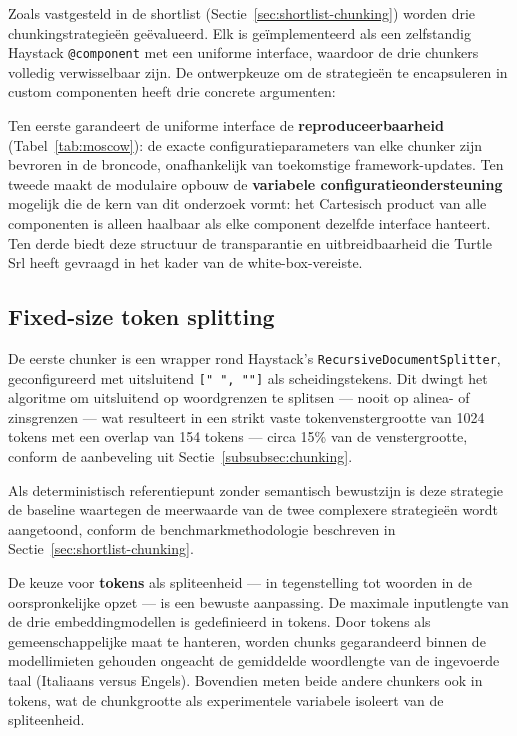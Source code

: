 Zoals vastgesteld in de shortlist (Sectie~\ref{sec:shortlist-chunking}) worden drie chunkingstrategieën geëvalueerd. Elk is geïmplementeerd als een zelfstandig Haystack \texttt{@component} met een uniforme interface, waardoor de drie chunkers volledig verwisselbaar zijn. De ontwerpkeuze om de strategieën te encapsuleren in custom componenten heeft drie concrete argumenten:

Ten eerste garandeert de uniforme interface de \textbf{reproduceerbaarheid} (Tabel~\ref{tab:moscow}): de exacte configuratieparameters van elke chunker zijn bevroren in de broncode, onafhankelijk van toekomstige framework-updates. Ten tweede maakt de modulaire opbouw de \textbf{variabele configuratieondersteuning} mogelijk die de kern van dit onderzoek vormt: het Cartesisch product van alle componenten is alleen haalbaar als elke component dezelfde interface hanteert. Ten derde biedt deze structuur de transparantie en uitbreidbaarheid die Turtle Srl heeft gevraagd in het kader van de white-box-vereiste.
\subsection{Fixed-size token splitting}
\label{subsec:fixed-chunker}

De eerste chunker is een wrapper rond Haystack's \texttt{RecursiveDocumentSplitter}, geconfigureerd met uitsluitend \texttt{[" ", ""]} als scheidingstekens. Dit dwingt het algoritme om uitsluitend op woordgrenzen te splitsen — nooit op alinea- of zinsgrenzen — wat resulteert in een strikt vaste tokenvenstergrootte van 1024 tokens met een overlap van 154 tokens — circa 15\% van de venstergrootte, conform de aanbeveling uit Sectie~\ref{subsubsec:chunking}.

Als deterministisch referentiepunt zonder semantisch bewustzijn is deze strategie de baseline waartegen de meerwaarde van de twee complexere strategieën wordt aangetoond, conform de benchmarkmethodologie beschreven in Sectie~\ref{sec:shortlist-chunking}.

De keuze voor \textbf{tokens} als spliteenheid — in tegenstelling tot woorden in de oorspronkelijke opzet — is een bewuste aanpassing. De maximale inputlengte van de drie embeddingmodellen is gedefinieerd in tokens. Door tokens als gemeenschappelijke maat te hanteren, worden chunks gegarandeerd binnen de modellimieten gehouden ongeacht de gemiddelde woordlengte van de ingevoerde taal (Italiaans versus Engels). Bovendien meten beide andere chunkers ook in tokens, wat de chunkgrootte als experimentele variabele isoleert van de spliteenheid.

